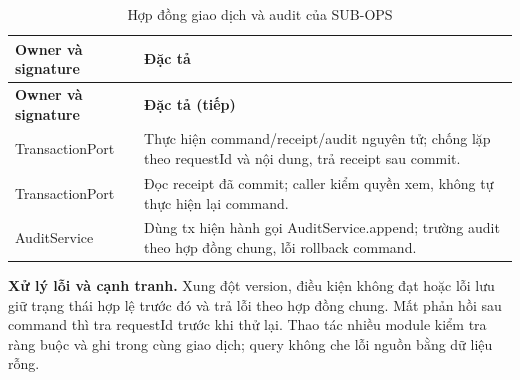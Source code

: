 \begin{longtable}{|L{58mm}|L{81mm}|}
\caption{Hợp đồng giao dịch và audit của SUB-OPS}\\\hline
\textbf{Owner và signature} & \textbf{Đặc tả}\\\hline
\endfirsthead
\hline\textbf{Owner và signature} & \textbf{Đặc tả (tiếp)}\\\hline\endhead
TransactionPort\par{} &
Thực hiện command/receipt/audit nguyên tử; chống lặp theo requestId và nội dung, trả receipt sau commit.\\\hline
TransactionPort\par{} &
Đọc receipt đã commit; caller kiểm quyền xem, không tự thực hiện lại command.\\\hline
AuditService\par{} &
Dùng tx hiện hành gọi AuditService.append; trường audit theo hợp đồng chung, lỗi rollback command.\\\hline
\end{longtable}

\textbf{Xử lý lỗi và cạnh tranh.} Xung đột version, điều kiện không đạt hoặc lỗi lưu giữ trạng thái hợp lệ trước đó và trả lỗi theo hợp đồng chung. Mất phản hồi sau command thì tra requestId trước khi thử lại. Thao tác nhiều module kiểm tra ràng buộc và ghi trong cùng giao dịch; query không che lỗi nguồn bằng dữ liệu rỗng.
